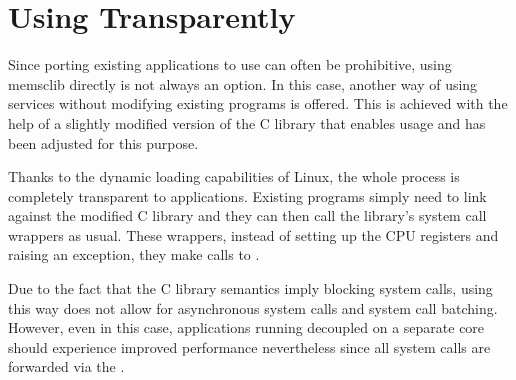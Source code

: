 \section{Using \memsc Transparently}

Since porting existing applications to use \lib can often be prohibitive, using
memsclib directly is not always an option. In this case, another way of using
\memsc services without modifying existing programs is offered. This is
achieved with the help of a slightly modified version of the C library that
enables \memsc usage and has been adjusted for this purpose.

Thanks to the dynamic loading capabilities of Linux, the whole process is
completely transparent to applications. Existing programs simply need to link
against the modified C library and they can then call the library's system call
wrappers as usual. These wrappers, instead of setting up the CPU registers and
raising an exception, they make calls to \lib.

Due to the fact that the C library semantics imply blocking system calls, using
\memsc this way does not allow for asynchronous system calls and system call
batching. However, even in this case, \llinux applications running decoupled on
a separate core should experience improved performance nevertheless since all
system calls are forwarded via the .
